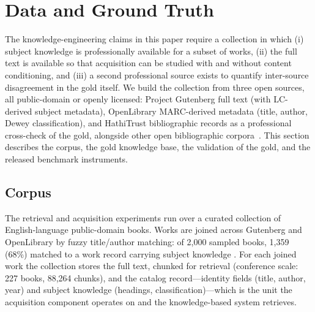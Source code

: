 
\section{Data and Ground Truth}
\label{sec:data}

The knowledge-engineering claims in this paper require a collection in
which (i) subject knowledge is professionally available for a subset of
works, (ii) the full text is available so that acquisition can be studied
with and without content conditioning, and (iii) a second professional
source exists to quantify inter-source disagreement in the gold itself. We
build the collection from three open sources, all public-domain or openly
licensed: Project Gutenberg full text (with LC-derived subject metadata),
OpenLibrary MARC-derived metadata (title, author, Dewey classification),
and HathiTrust bibliographic records as a professional cross-check of the
gold, alongside other open bibliographic
corpora~\cite{hathitrust_ef, blbooks}. This section describes the corpus, the gold knowledge base, the
validation of the gold, and the released benchmark instruments.

\subsection{Corpus}
\label{sec:data:corpus}

The retrieval and acquisition experiments run over a curated collection of
English-language public-domain books. Works are joined across Gutenberg and
OpenLibrary by fuzzy title/author matching: of 2{,}000 sampled books,
1{,}359 (68\%) matched to a work record carrying subject knowledge
. For each joined work the collection stores the full
text, chunked for retrieval (conference scale: 227 books, 88{,}264
chunks), and the catalog record---identity fields (title, author, year) and
subject knowledge (headings, classification)---which is the unit the
acquisition component operates on and the knowledge-based system retrieves.

